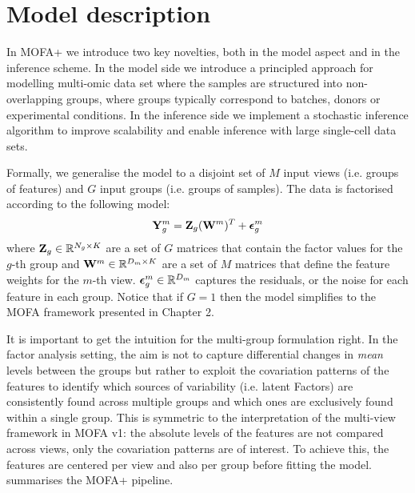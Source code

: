 \graphicspath{{Chapter4/Figs/simulations/}{Chapter4/Figs/scrna/}{Chapter4/Figs/scmet/}{Chapter4/Figs/scnmt/}}

\section{Model description}

In MOFA+ we introduce two key novelties, both in the model aspect and in the inference scheme. In the model side we introduce a principled approach for modelling multi-omic data set where the samples are structured into non-overlapping groups, where groups typically correspond to batches, donors or experimental conditions. In the inference side we implement a stochastic inference algorithm to improve scalability and enable inference with large single-cell data sets.

Formally, we generalise the model to a disjoint set of $M$ input views (i.e. groups of features) and $G$ input groups (i.e. groups of samples). The data is factorised according to the following model:
\begin{equation} \label{mofa_master_equation}
	\mathbf{Y}^{m}_{g} = \mathbf{Z}_{g} (\mathbf{W}^{m})^T + \mbox{\boldmath $\epsilon$}^{m}_{g}
\end{equation}
where ${\bf Z}_{g} \in \mathbb{R}^{N_{g} \times K}$ are a set of $G$ matrices that contain the factor values for the $g$-th group and ${\bf W}^{m} \in \mathbb{R}^{D_m \times K}$ are a set of $M$ matrices that define the feature weights for the $m$-th view. $\mbox{\boldmath $\epsilon$}^{m}_{g} \in \mathbb{R}^{D_m}$ captures the residuals, or the noise for each feature in each group. Notice that if $G=1$ then the model simplifies to the MOFA framework presented in Chapter 2. 

It is important to get the intuition for the multi-group formulation right. In the factor analysis setting, the aim is not to capture differential changes in \textit{mean} levels between the groups but rather to exploit the covariation patterns of the features to identify which sources of variability (i.e. latent Factors) are consistently found across multiple groups and which ones are exclusively found within a single group. This is symmetric to the interpretation of the multi-view framework in MOFA v1: the absolute levels of the features are not compared across views, only the covariation patterns are of interest. To achieve this, the features are centered per view and also per group before fitting the model.  summarises the MOFA+ pipeline.

